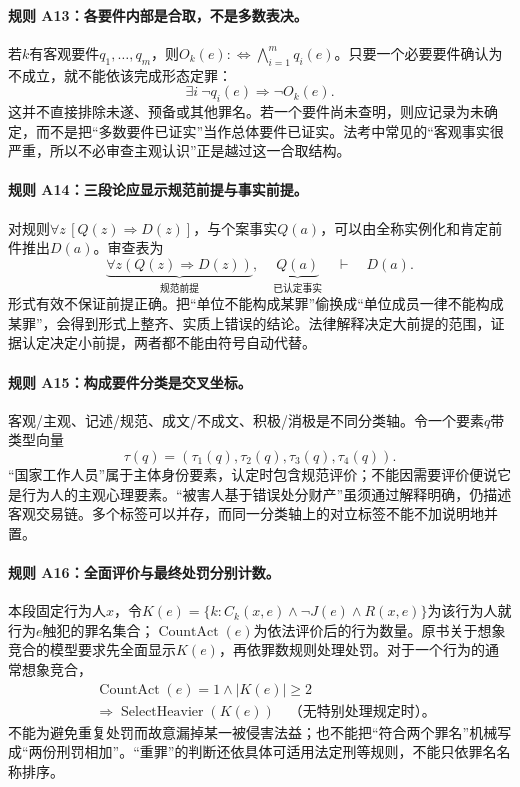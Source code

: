 \paragraph{规则 A13：各要件内部是合取，不是多数表决。}
若$k$有客观要件$q_1,\ldots,q_m$，则$O_k(e):\!\iff\bigwedge_{i=1}^{m}q_i(e)$。只要一个必要要件确认为不成立，就不能依该完成形态定罪：
\[
\exists i\ \neg q_i(e)\Longrightarrow\neg O_k(e).
\]
这并不直接排除未遂、预备或其他罪名。若一个要件尚未查明，则应记录为未确定，而不是把“多数要件已证实”当作总体要件已证实。法考中常见的“客观事实很严重，所以不必审查主观认识”正是越过这一合取结构。

\paragraph{规则 A14：三段论应显示规范前提与事实前提。}
对规则$\forall z\,[Q(z)\Rightarrow D(z)]$，与个案事实$Q(a)$，可以由全称实例化和肯定前件推出$D(a)$。审查表为
\[
\underbrace{\forall z(Q(z)\Rightarrow D(z))}_{\text{规范前提}}
,\quad\underbrace{Q(a)}_{\text{已认定事实}}
\quad\vdash\quad D(a).
\]
形式有效不保证前提正确。把“单位不能构成某罪”偷换成“单位成员一律不能构成某罪”，会得到形式上整齐、实质上错误的结论。法律解释决定大前提的范围，证据认定决定小前提，两者都不能由符号自动代替。

\paragraph{规则 A15：构成要件分类是交叉坐标。}
客观/主观、记述/规范、成文/不成文、积极/消极是不同分类轴。令一个要素$q$带类型向量
\[
\tau(q)=(\tau_1(q),\tau_2(q),\tau_3(q),\tau_4(q)).
\]
“国家工作人员”属于主体身份要素，认定时包含规范评价；不能因需要评价便说它是行为人的主观心理要素。“被害人基于错误处分财产”虽须通过解释明确，仍描述客观交易链。多个标签可以并存，而同一分类轴上的对立标签不能不加说明地并置。

\paragraph{规则 A16：全面评价与最终处罚分别计数。}
本段固定行为人$x$，令$K(e)=\{k:C_k(x,e)\land\neg J(e)\land R(x,e)\}$为该行为人就行为$e$触犯的罪名集合；$\operatorname{CountAct}(e)$为依法评价后的行为数量。原书关于想象竞合的模型要求先全面显示$K(e)$，再依罪数规则处理处罚。对于一个行为的通常想象竞合，
\[
\begin{aligned}
&\operatorname{CountAct}(e)=1\land |K(e)|\ge2\\
&\Longrightarrow\operatorname{SelectHeavier}(K(e))
\quad\text{（无特别处理规定时）。}
\end{aligned}
\]
不能为避免重复处罚而故意漏掉某一被侵害法益；也不能把“符合两个罪名”机械写成“两份刑罚相加”。“重罪”的判断还依具体可适用法定刑等规则，不能只依罪名名称排序。

